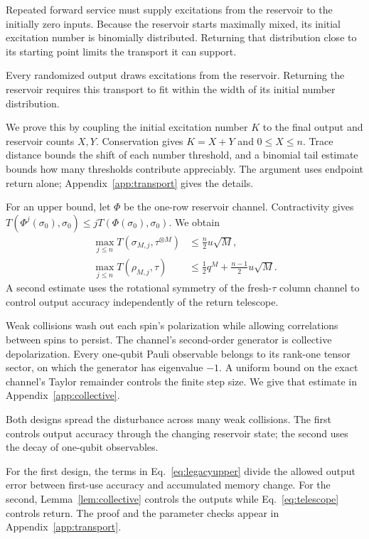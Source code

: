 \documentclass[aps,pra,reprint,superscriptaddress,longbibliography,nofootinbib,floatfix]{revtex4-2}
\begin{document}
Repeated forward service must supply excitations from the reservoir to the initially zero inputs. Because the reservoir starts maximally mixed, its initial excitation number is binomially distributed. Returning that distribution close to its starting point limits the transport it can support.


Every randomized output draws excitations from the reservoir. Returning the reservoir requires this transport to fit within the width of its initial number distribution.

We prove this by coupling the initial excitation number $K$ to the final output and reservoir counts $X,Y$. Conservation gives $K=X+Y$ and $0\le X\le n$. Trace distance bounds the shift of each number threshold, and a binomial tail estimate bounds how many thresholds contribute appreciably. The argument uses endpoint return alone; Appendix~\ref{app:transport} gives the details.

For an upper bound, let $\Phi$ be the one-row reservoir channel. Contractivity gives $T(\Phi^j(\sigma_0),\sigma_0)\le jT(\Phi(\sigma_0),\sigma_0)$. We obtain
\begin{align}
 \max_{j\le n}T(\sigma_{M,j},\tau^{\otimes M})
 &\le\tfrac n2u\sqrt M,\label{eq:telescope}\\
 \max_{j\le n}T(\rho_{M,j},\tau)
 &\le\tfrac12q^M+\tfrac{n-1}{2}u\sqrt M.
 \label{eq:legacyupper}
\end{align}
A second estimate uses the rotational symmetry of the fresh-$\tau$ column channel to control output accuracy independently of the return telescope.


Weak collisions wash out each spin's polarization while allowing correlations between spins to persist. The channel's second-order generator is collective depolarization. Every one-qubit Pauli observable belongs to its rank-one tensor sector, on which the generator has eigenvalue $-1$. A uniform bound on the exact channel's Taylor remainder controls the finite step size. We give that estimate in Appendix~\ref{app:collective}.


Both designs spread the disturbance across many weak collisions. The first controls output accuracy through the changing reservoir state; the second uses the decay of one-qubit observables.

For the first design, the terms in Eq.~\eqref{eq:legacyupper} divide the allowed output error between first-use accuracy and accumulated memory change. For the second, Lemma~\ref{lem:collective} controls the outputs while Eq.~\eqref{eq:telescope} controls return. The proof and the parameter checks appear in Appendix~\ref{app:transport}.
\end{document}
